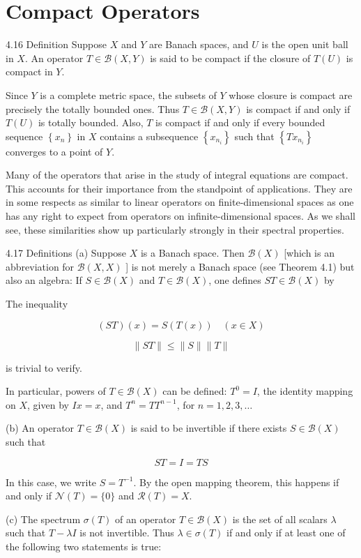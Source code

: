 \documentclass[10pt]{article}
\begin{document}
\section{Compact Operators}
4.16 Definition Suppose $X$ and $Y$ are Banach spaces, and $U$ is the open unit ball in $X$. An operator $T \in \mathscr{B}(X, Y)$ is said to be compact if the closure of $T(U)$ is compact in $Y$.

Since $Y$ is a complete metric space, the subsets of $Y$ whose closure is compact are precisely the totally bounded ones. Thus $T \in \mathscr{B}(X, Y)$ is compact if and only if $T(U)$
is totally bounded. Also, $T$ is compact if and only if every bounded sequence $\left\{x_{n}\right\}$ in $X$ contains a subsequence $\left\{x_{n_{i}}\right\}$ such that $\left\{T x_{n_{i}}\right\}$ converges to a point of $Y$.

Many of the operators that arise in the study of integral equations are compact. This accounts for their importance from the standpoint of applications. They are in some respects as similar to linear operators on finite-dimensional spaces as one has any right to expect from operators on infinite-dimensional spaces. As we shall see, these similarities show up particularly strongly in their spectral properties.

4.17 Definitions (a) Suppose $X$ is a Banach space. Then $\mathscr{B}(X)$ [which is an abbreviation for $\mathscr{B}(X, X)$ ] is not merely a Banach space (see Theorem 4.1) but also an algebra: If $S \in \mathscr{B}(X)$ and $T \in \mathscr{B}(X)$, one defines $S T \in \mathscr{B}(X)$ by

The inequality

$$
(S T)(x)=S(T(x)) \quad(x \in X)
$$

$$
\|S T\| \leq\|S\|\|T\|
$$

is trivial to verify.

In particular, powers of $T \in \mathscr{B}(X)$ can be defined: $T^{0}=I$, the identity mapping on $X$, given by $I x=x$, and $T^{n}=T T^{n-1}$, for $n=1,2,3, \ldots$

(b) An operator $T \in \mathscr{B}(X)$ is said to be invertible if there exists $S \in \mathscr{B}(X)$ such that

$$
S T=I=T S
$$

In this case, we write $S=T^{-1}$. By the open mapping theorem, this happens if and only if $\mathscr{N}(T)=\{0\}$ and $\mathscr{R}(T)=X$.

(c) The spectrum $\sigma(T)$ of an operator $T \in \mathscr{B}(X)$ is the set of all scalars $\lambda$ such that $T-\lambda I$ is not invertible. Thus $\lambda \in \sigma(T)$ if and only if at least one of the following two statements is true:
\end{document}
